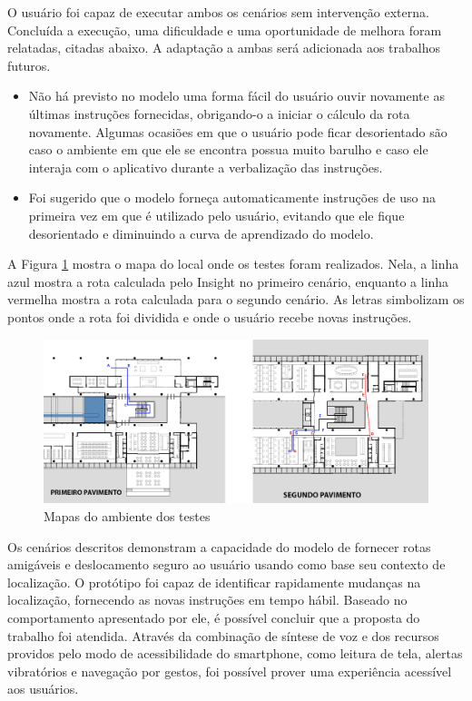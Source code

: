 \documentclass[twoside,english,brazilian]{UNISINOSartigo}
\begin{document}
O usuário foi capaz de executar ambos os cenários sem intervenção externa. Concluída a execução, uma dificuldade e uma oportunidade de melhora foram relatadas, citadas abaixo. A adaptação a ambas será adicionada aos trabalhos futuros.
\begin{itemize}
	\item Não há previsto no modelo uma forma fácil do usuário ouvir novamente as últimas instruções fornecidas, obrigando-o a iniciar o cálculo da rota novamente. Algumas ocasiões em que o usuário pode ficar desorientado são caso o ambiente em que ele se encontra possua muito barulho e caso ele interaja com o aplicativo durante a verbalização das instruções. 

	\item Foi sugerido que o modelo forneça automaticamente instruções de uso na primeira vez em que é utilizado pelo usuário, evitando que ele fique desorientado e diminuindo a curva de aprendizado do modelo.
\end{itemize}

A Figura \ref{apendice:planta1} mostra o mapa do local onde os testes foram realizados. Nela, a linha azul mostra a rota calculada pelo Insight no primeiro cenário, enquanto a linha vermelha mostra a rota calculada para o segundo cenário. As letras simbolizam os pontos onde a rota foi dividida e onde o usuário recebe novas instruções.

 	\begin{figure}[!ht]
 		\caption{Mapas do ambiente dos testes}
 		\label{apendice:planta1}
 		\centering%
 		\begin{minipage}{0.8\textwidth}
 			\includegraphics[width=\textwidth]{imgs/unicaImagem}
 		\end{minipage}
 	\end{figure}

Os cenários descritos demonstram a capacidade do modelo de fornecer rotas amigáveis e deslocamento seguro ao usuário usando como base seu contexto de localização. O protótipo foi capaz de identificar rapidamente mudanças na localização, fornecendo as novas instruções em tempo hábil. Baseado no comportamento apresentado por ele, é possível concluir que a proposta do trabalho foi atendida. Através da combinação de síntese de voz e dos recursos providos pelo modo de acessibilidade do smartphone, como leitura de tela, alertas vibratórios e navegação por gestos, foi possível prover uma experiência acessível aos usuários.
\end{document}
